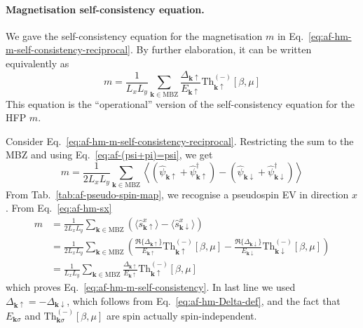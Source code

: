 \paragraph{Magnetisation self-consistency equation.}

We gave the self-consistency equation for the magnetisation $m$ in Eq.~\eqref{eq:af-hm-m-self-consistency-reciprocal}. By further elaboration, it can be written equivalently as
\begin{equation}\label{eq:af-hm-m-self-consistency}
	m = \frac{1}{L_x L_y} \sum_{\mathbf{k} \in \mathrm{MBZ}} \frac{\Delta_{\mathbf{k}\uparrow}}{E_{\mathbf{k}\uparrow}} \mathrm{Th}_{\mathbf{k}\uparrow}^{(-)}[\beta,\mu]
\end{equation}
This equation is the ``operational'' version of the self-consistency equation for the HFP $m$.

\begin{tabproof}

	Consider Eq.~\eqref{eq:af-hm-m-self-consistency-reciprocal}. Restricting the sum to the MBZ and using Eq.~\eqref{eq:af-(psi+pi)=psi}, we get
	\[
		m = \frac{1}{2L_xL_y} \sum_{\mathbf{k} \in \mathrm{MBZ}} \left\langle
		\left(\hat \psi_{\mathbf{k}\uparrow} + \hat \psi_{\mathbf{k}\uparrow}^\dagger\right) - \left(\hat \psi_{\mathbf{k}\downarrow} + \hat \psi_{\mathbf{k}\downarrow}^\dagger\right)
		\right\rangle
	\]
	From Tab.~\ref{tab:af-pseudo-spin-map}, we recognise a pseudospin EV in direction $x$. From Eq.~\eqref{eq:af-hm-sx}
	\[
	\begin{aligned}
		m &= \frac{1}{2L_xL_y} \sum_{\mathbf{k} \in \mathrm{MBZ}} \left(
			\langle
				\hat s_{\mathbf{k}\uparrow}^x
			\rangle
			- 
			\langle
				\hat s_{\mathbf{k}\downarrow}^x
			\rangle
		\right) \\
		&= \frac{1}{2L_xL_y} \sum_{\mathbf{k} \in \mathrm{MBZ}} \left(
			\frac{\Re\lbrace\Delta_{\mathbf{k}\uparrow}\rbrace}{E_{\mathbf{k}\uparrow}} \mathrm{Th}_{\mathbf{k}\uparrow}^{(-)}[\beta,\mu] - \frac{\Re\lbrace\Delta_{\mathbf{k}\downarrow}\rbrace}{E_{\mathbf{k}\downarrow}} \mathrm{Th}_{\mathbf{k}\downarrow}^{(-)}[\beta,\mu]
		\right) \\
		&= \frac{1}{L_x L_y} \sum_{\mathbf{k} \in \mathrm{MBZ}} \frac{\Delta_{\mathbf{k}\uparrow}}{E_{\mathbf{k}\uparrow}} \mathrm{Th}_{\mathbf{k}\uparrow}^{(-)}[\beta,\mu]
	\end{aligned}
	\]
	which proves Eq.~\eqref{eq:af-hm-m-self-consistency}. In last line we used $\Delta_{\mathbf{k}\uparrow} = -\Delta_{\mathbf{k}\downarrow}$, which follows from Eq.~\eqref{eq:af-hm-Delta-def}, and the fact that $E_{\mathbf{k}\sigma}$ and $\mathrm{Th}_{\mathbf{k}\sigma}^{(-)}[\beta,\mu]$ are spin actually spin-independent.

\end{tabproof}


